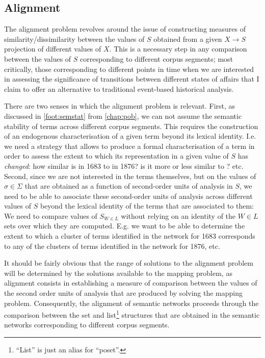 \subsection{Alignment}

The alignment problem revolves around the issue of constructing measures of similarity/dissimilarity between the values of $S$ obtained from a given $X \rightarrow S$ projection of different values of $X$.
This is a necessary step in any comparison between the values of $S$ corresponding to different corpus segments; most critically, those corresponding to different points in time when we are interested in assessing the significance of transitions between different states of affairs that I claim to offer an alternative to traditional event-based historical analysis.

There are two senses in which the alignment problem is relevant.
First, as discussed in \autoref{foot:semstat} from \autoref{chap:pob}, we can not assume the semantic stability of terms across different corpus segments.
This requires the construction of an endogenous characterisation of a given term beyond its lexical identity.
I.e. we need a strategy that allows to produce a formal characterisation of a term in order to assess the extent to which its representation in a given value of $S$ has \emph{changed}:  how similar is  in 1683 to  in 1876? is it more or less similar to ? etc.
Second, since we are not interested in the terms themselves, but on the values of $\sigma \in \Sigma$ that are obtained as a function of second-order units of analysis in $S$, we need to be able to associate these second-order units of analysis across different values of $S$ beyond the lexical identity of the terms that are associated to them:
We need to compare values of $S_{W \in L}$ without relying on an identity of the $W \in L$ sets over which they are computed.
E.g. we want to be able to determine the extent to which a cluster of terms identified in the network for 1683 corresponds to any of the clusters of terms identified in the network for 1876, etc.

It should be fairly obvious that the range of solutions to the alignment problem will be determined by the solutions available to the mapping problem, as alignment consists in establishing a measure of comparison between the values of the second order units of analysis that are produced by solving the mapping problem.
Consequently, the alignment of semantic networks proceeds through the comparison between the set and list\footnote{
    ``List'' is just an alias for ``poset''.
} structures that are obtained in the semantic networks corresponding to different corpus segments.

